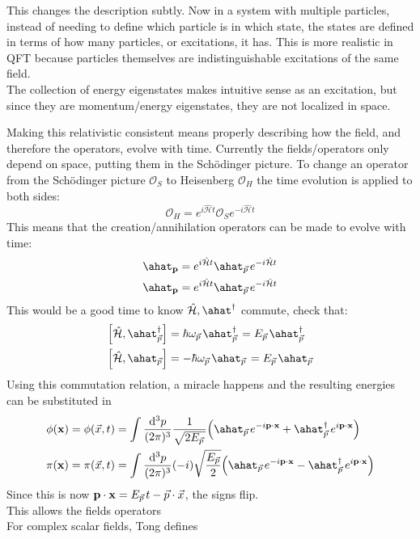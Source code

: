 This changes the description subtly. Now in a system with multiple particles, instead of needing to define which particle is in which state, the states are defined in terms of how many particles, or excitations, it has. This is more realistic in QFT because particles themselves are indistinguishable excitations of the same field.
\\
The collection of energy eigenstates makes intuitive sense as an excitation, but since they are momentum/energy eigenstates, they are not localized in space.  

Making this relativistic consistent means properly describing how the field, and therefore the operators, evolve with time. Currently the fields/operators only depend on space, putting them in the Sch\"odinger picture. To change an operator from the Sch\"odinger picture \(\mathcal{O}_{S}\) to Heisenberg \(\mathcal{O}_{H}\) the time evolution is applied to both sides:
\begin{equation}
	\mathcal{O}_{H} = e^{i\hat{\mathcal{H}}t}\mathcal{O}_{S}e^{-i\hat{\mathcal{H}}t}
\end{equation}
This means that the creation/annihilation operators can be made to evolve with time:
\begin{align*}
	\ahat_{\vb{p}}&=e^{i\hat{\mathcal{H}}t}\ahat_{\ppp}e^{-i\hat{\mathcal{H}}t}
	\\
	\ahat_{\vb{p}}&=e^{i\hat{\mathcal{H}}t}\ahat_{\ppp}e^{-i\hat{\mathcal{H}}t}
\end{align*}
This would be a good time to know \(\hat{\mathcal{H}},\ahat^{\dagger}\) commute, check that:
\begin{align}
	\qty[\hat{\mathcal{H}},\ahat^{\dagger}_{\vec{p}}]
	&= \hbar\omega_{\ppp}\ahat^{\dagger}_{\ppp}
	 = E_{\ppp}\ahat_{\vec{p}}^{\dagger}
	\\
	\qty[\hat{\mathcal{H}},\ahat_{\vec{p}}]
	&=-\hbar\omega_{\ppp}\ahat_{\ppp}
	=E_{\ppp}\ahat_{\vec{p}}
\end{align}
Using this commutation relation, a miracle happens and the resulting energies can be substituted in
\begin{align}
	\phi(\vb{x})=\phi(\vec{x},t)&=\int
	\frac{\d^3p}{(2\pi)^3}
	\oo{\sqrt{2E_{\ppp}}}
	\qty(
		\ahat_{\ppp}e^{-i\vb{p}\cdot\vb{x}}
		+
		\ahat_{\vec{p}}^{\dagger}\,e^{i\vb{p}\cdot\vb{x}}
	)\label{eqn:}
	\\
	\pi(\vb{x})=\pi(\vec{x},t)&=\int\frac{\d^3p}{(2\pi)^3}
	(-i)\sqrt{\frac{E_{\vec{p}}}{2}}
	\qty(
		\ahat_{\ppp}e^{-i\vb{p}\cdot\vb{x}}
		-
		\ahat_{\vec{p}}^{\dagger}\,e^{i\vb{p}\cdot\vb{x}}
	)
\end{align}
Since this is now \(\vb{p}\cdot\vb{x}=E_{{\vec{p}\,}}t-\vec{p}\cdot\vec{x}\), the signs flip.
\\
This allows the fields operators \\
For complex scalar fields, Tong defines

